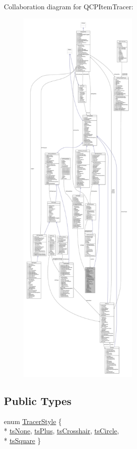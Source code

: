 Collaboration diagram for Q\+C\+P\+Item\+Tracer\+:\nopagebreak
\begin{figure}[H]
\begin{center}
\leavevmode
\includegraphics[height=550pt]{class_q_c_p_item_tracer__coll__graph}
\end{center}
\end{figure}
\subsection*{Public Types}
\begin{DoxyCompactItemize}
\item 
enum \hyperlink{class_q_c_p_item_tracer_a2f05ddb13978036f902ca3ab47076500}{Tracer\+Style} \{ \\*
\hyperlink{class_q_c_p_item_tracer_a2f05ddb13978036f902ca3ab47076500aac27462c79146225bfa8fba24d2ee8a4}{ts\+None}, 
\hyperlink{class_q_c_p_item_tracer_a2f05ddb13978036f902ca3ab47076500a3323fb04017146e4885e080a459472fa}{ts\+Plus}, 
\hyperlink{class_q_c_p_item_tracer_a2f05ddb13978036f902ca3ab47076500af562ec81ac3ba99e26ef8540cf1ec16f}{ts\+Crosshair}, 
\hyperlink{class_q_c_p_item_tracer_a2f05ddb13978036f902ca3ab47076500ae2252c28f4842880d71e9f94e69de94e}{ts\+Circle}, 
\\*
\hyperlink{class_q_c_p_item_tracer_a2f05ddb13978036f902ca3ab47076500a4ed5f01f2c5fd86d980366d79f481b9b}{ts\+Square}
 \}
\end{DoxyCompactItemize}
